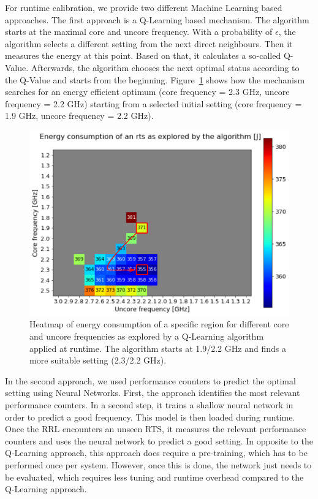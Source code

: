 For runtime calibration, we provide two different Machine Learning based approaches. The first approach is a Q-Learning based mechanism. The algorithm starts at the maximal core and uncore frequency. With a probability of {$\epsilon$}, the algorithm selects a different setting from the next direct neighbours. Then it measures the energy at this point. Based on that, it calculates a so-called Q-Value. Afterwards, the algorithm chooses the next optimal status according to the Q-Value and starts from the beginning. Figure~\ref{fig:qlearning} shows how the mechanism searches for an energy efficient optimum (core frequency = 2.3 GHz, uncore frequency = 2.2 GHz) starting from a selected initial setting (core frequency = 1.9 GHz, uncore frequency = 2.2 GHz).
\begin{figure}[!t]
\centering
\includegraphics[width=.8\columnwidth]{figures/q_learning.png}
\caption{Heatmap of energy consumption of a specific region for different core and uncore frequencies as explored by a Q-Learning algorithm applied at runtime. The algorithm starts at 1.9/2.2 GHz and finds a more suitable setting (2.3/2.2 GHz).}
\label{fig:qlearning}
\end{figure}
In the second approach, we used performance counters to predict the optimal setting using Neural Networks. First, the approach identifies the most relevant performance counters. In a second step, it trains a shallow neural network in order to predict a good frequency. This model is then loaded during runtime. Once the RRL encounters an unseen RTS, it measures the relevant performance counters and uses the neural network to predict a good setting. In opposite to the Q-Learning approach, this approach does require a pre-training, which has to be performed once per system. However, once this is done, the network just needs to be evaluated, which requires less tuning and runtime overhead compared to the Q-Learning approach. 


